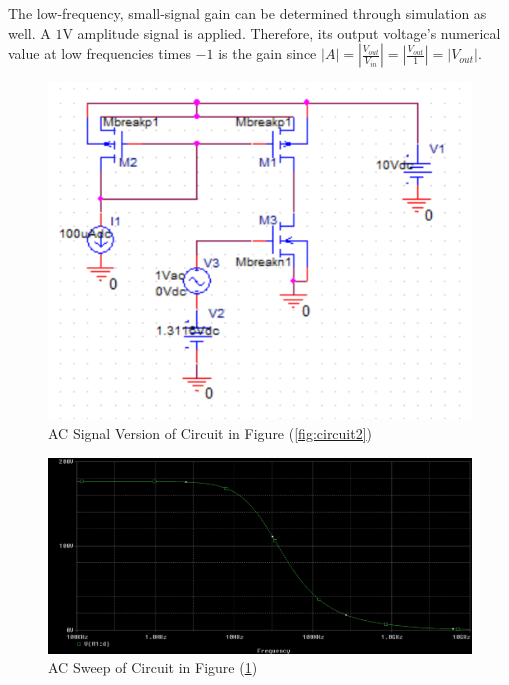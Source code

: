 The low-frequency, small-signal gain can be determined through simulation as well. A $1$\si{\volt} amplitude signal is applied. Therefore, its output voltage's numerical value at low frequencies times $-1$ is the gain since $|A| = |\frac{V_{out}}{V_{in}}| = |\frac{V_{out}}{1}| = |V_{out}|$.

\FloatBarrier

\begin{figure}[h!]
	\centering
	\includegraphics[scale=0.75]{./images/circuit3.PNG}
	\caption{AC Signal Version of Circuit in Figure (\ref{fig:circuit2})}
	\label{fig:circuit3}
\end{figure}

\FloatBarrier

\FloatBarrier

\begin{figure}[h!]
	\centering
	\includegraphics[scale=0.50]{./images/circuit3_ac_sweep.PNG}
	\caption{AC Sweep of Circuit in Figure (\ref{fig:circuit3})}
	\label{fig:circuit3_ac_sweep}
\end{figure}

